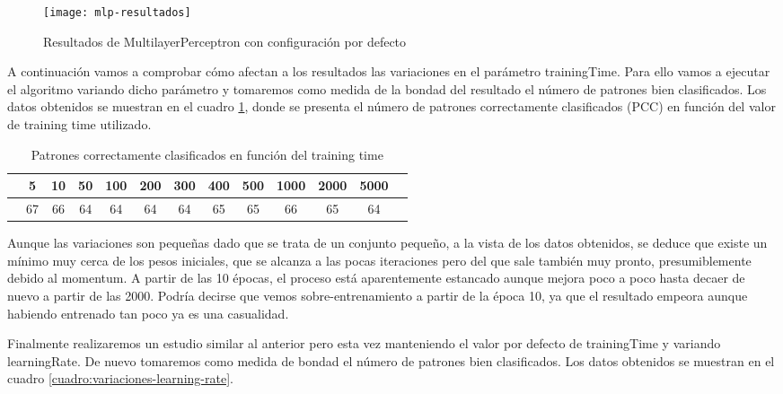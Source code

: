 \begin{figure}[H]
    \centering
    \texttt{[image: mlp-resultados]}
    \caption{Resultados de MultilayerPerceptron con configuración por defecto}
    \label{fig:mlp-resultados}
\end{figure}

A continuación vamos a comprobar cómo afectan a los resultados las variaciones en el parámetro trainingTime. Para ello vamos a ejecutar el algoritmo variando dicho parámetro y tomaremos como medida de la bondad del resultado el número de patrones bien clasificados. Los datos obtenidos se muestran en el cuadro \ref{cuadro:variaciones-training-time}, donde se presenta el número de patrones correctamente clasificados (PCC) en función del valor de training time utilizado.

\begin{table}[ht]
    \centering
    \begin{tabular}{|r|c|c|c|c|c|c|c|c|c|c|c|c|}
    \hline
    \cellcolor[HTML]{9B9B9B}{\color[HTML]{FFFFFF} Training Time} & 5 & 10 & 50  & 100 & 200 & 300 & 400 & 500 & 1000 & 2000 & 5000  \\ \hline
    \cellcolor[HTML]{9B9B9B}{\color[HTML]{FFFFFF} PCC} & 67 & 66 & 64 & 64 & 64 & 64 & 65 & 65 & 66 & 65 & 64 \\ \hline
    \end{tabular}
    \caption{Patrones correctamente clasificados en función del training time}
    \label{cuadro:variaciones-training-time}
\end{table}

Aunque las variaciones son pequeñas dado que se trata de un conjunto pequeño, a la vista de los datos obtenidos, se deduce que existe un mínimo muy cerca de los pesos iniciales, que se alcanza a las pocas iteraciones pero del que sale también muy pronto, presumiblemente debido al momentum. A partir de las 10 épocas, el proceso está aparentemente estancado aunque mejora poco a poco hasta decaer de nuevo a partir de las 2000. Podría decirse que vemos sobre-entrenamiento a partir de la época 10, ya que el resultado empeora aunque habiendo entrenado tan poco ya es una casualidad.

Finalmente realizaremos un estudio similar al anterior pero esta vez manteniendo el valor por defecto de trainingTime y variando learningRate. De nuevo tomaremos como medida de bondad el número de patrones bien clasificados. Los datos obtenidos se muestran en el cuadro \ref{cuadro:variaciones-learning-rate}.

